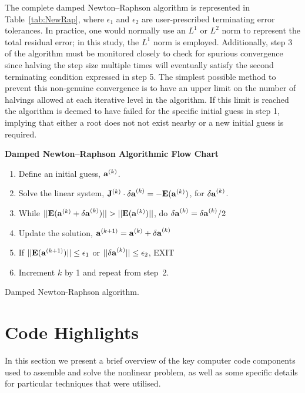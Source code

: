 The complete damped Newton--Raphson algorithm is represented in Table~\ref{tab:NewRap}, where $\epsilon_1$ and $\epsilon_2$ are user-prescribed terminating error tolerances. In practice, one would normally use an $L^1$ or $L^2$ norm to represent the total residual error; in this study, the $L^1$ norm is employed. Additionally, step 3 of the algorithm must be monitored closely to check for spurious convergence since halving the step size multiple times will eventually satisfy the second terminating condition expressed in step 5. The simplest possible method to prevent this non-genuine convergence is to have an upper limit on the number of halvings allowed at each iterative level in the algorithm. If this limit is reached the algorithm is deemed to have failed for the specific initial guess in step 1, implying that either a root does not not exist nearby or a new initial guess is required.
\begin{table}[htbp]
	\centering
	{\bfseries Damped Newton--Raphson Algorithmic Flow Chart}
	\begin{enumerate}
	\item Define an initial guess, $\mathbf{a}^{(k)}$.
	\item Solve the linear system, $\mathbf{J}^{(k)}\cdot\mathbf{\delta a}^{(k)} = -\mathbf{E}(\mathbf{a}^{(k)})$, for $\mathbf{\delta a}^{(k)}$.
	\item While $||\mathbf{E}(\mathbf{a}^{(k)}+\mathbf{\delta a}^{(k)})|| > ||\mathbf{E}(\mathbf{a}^{(k)})||$, do $\mathbf{\delta a}^{(k)}=\mathbf{\delta a}^{(k)}/2$
	\item Update the solution, $\mathbf{a}^{(k+1)}=\mathbf{a}^{(k)}+ \mathbf{\delta a}^{(k)}$
	\item If $||\mathbf{E}(\mathbf{a}^{(k+1)})|| \le \epsilon_1$ or $||\mathbf{\delta a}^{(k)}|| \le \epsilon_2$, EXIT
	\item Increment $k$ by 1 and repeat from step~2.
	\end{enumerate}
	\caption{Damped Newton-Raphson algorithm.}
	\label{tab:NewRap}
\end{table}

\section{Code Highlights}
In this section we present a brief overview of the key computer code components used to assemble and solve the nonlinear problem, as well as some specific details for particular techniques that were utilised.
